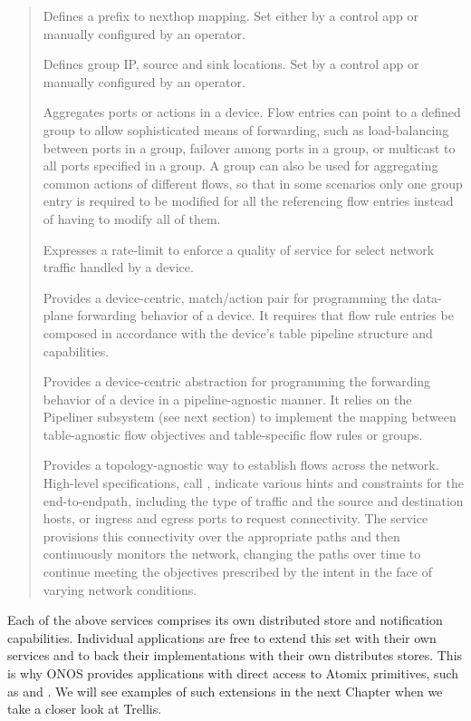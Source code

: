 \documentclass[letterpaper,11pt,english]{sphinxmanual}
\begin{document}
\begin{quote}

 Defines a prefix to nexthop mapping. Set either by a
control app or manually configured by an operator.

 Defines group IP, source and sink locations. Set by a
control app or manually configured by an operator.

 Aggregates ports or actions in a device. Flow entries can
point to a defined group to allow sophisticated means of forwarding,
such as load-balancing between ports in a group, failover among
ports in a group, or multicast to all ports specified in a group.  A
group can also be used for aggregating common actions of different
flows, so that in some scenarios only one group entry is required to
be modified for all the referencing flow entries instead of having
to modify all of them.

 Expresses a rate-limit to enforce a quality of service
for select network traffic handled by a device.

 Provides a device-centric, match/action pair for
programming the data-plane forwarding behavior of a device. It
requires that flow rule entries be composed in accordance with the
device’s table pipeline structure and capabilities.

 Provides a device-centric abstraction for
programming the forwarding behavior of a device in a
pipeline-agnostic manner. It relies on the Pipeliner subsystem (see
next section) to implement the mapping between table-agnostic flow
objectives and table-specific flow rules or groups.

 Provides a topology-agnostic way to establish flows
across the network. High-level specifications, call ,
indicate various hints and constraints for the end-to-endpath,
including the type of traffic and the source and destination hosts,
or ingress and egress ports to request connectivity. The service
provisions this connectivity over the appropriate paths and then
continuously monitors the network, changing the paths over time to
continue meeting the objectives prescribed by the intent in the face
of varying network conditions.
\end{quote}

Each of the above services comprises its own distributed store and
notification capabilities. Individual applications are free to extend
this set with their own services and to back their implementations
with their own distributes stores. This is why ONOS provides
applications with direct access to Atomix primitives, such as
 and . We will see examples of such
extensions in the next Chapter when we take a closer look at Trellis.
\end{document}

